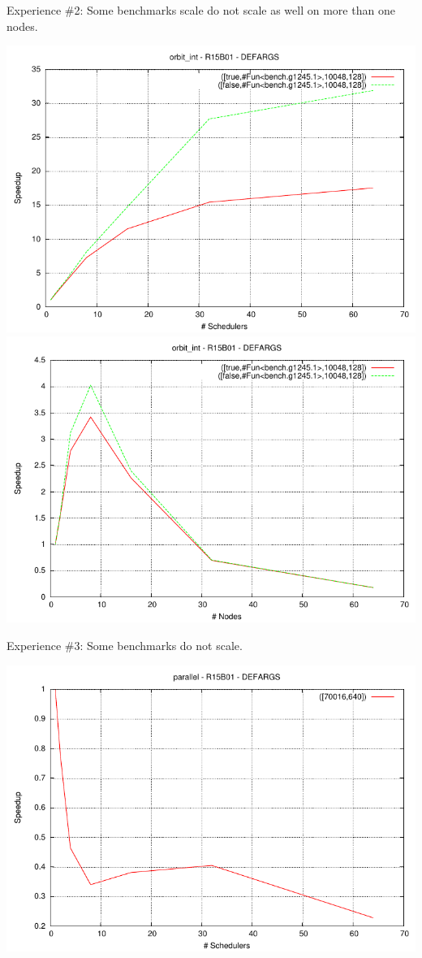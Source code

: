 \documentclass{beamer}
\begin{document}
\begin{frame}{Experience \#2: Some benchmarks scale do not scale as well on more than one nodes.}
    \begin{center}
        \includegraphics[width=0.45\linewidth]{figures/orbit_int_par-speedup-bulldozer.pdf}
        \includegraphics[width=0.45\linewidth]{figures/orbit_int_dist-speedup-bulldozer.pdf}
    \end{center}
\end{frame}

\begin{frame}{Experience \#3: Some benchmarks do not scale.}
    \begin{center}
        \includegraphics[width=0.8\linewidth]{figures/parallel-speedup-bulldozer.pdf}
    \end{center}
\end{frame}
\end{document}

